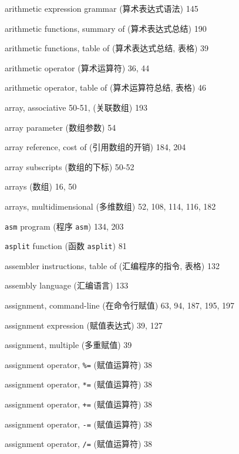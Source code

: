 \begin{multicols}{2}
\hangindent=2pc  arithmetic expression grammar (算术表达式语法) 145

\hangindent=2pc  arithmetic functions, summary of
(算术表达式总结) 190

\hangindent=2pc  arithmetic functions, table of
(算术表达式总结, 表格) 39

\hangindent=2pc  arithmetic operator (算术运算符) 36, 44

\hangindent=2pc  arithmetic operator, table of (算术运算符总结,
表格) 46

\hangindent=2pc  array, associative 50-51, (关联数组) 193

\hangindent=2pc  array parameter (数组参数) 54

\hangindent=2pc  array reference, cost of (引用数组的开销) 184, 204

\hangindent=2pc  array subscripts (数组的下标) 50-52

\hangindent=2pc  arrays (数组) 16, 50

\hangindent=2pc  arrays, multidimensional (多维数组) 52, 108, 114, 116, 182

\hangindent=2pc  \verb'asm' program (程序 \verb'asm') 134, 203

\hangindent=2pc  \verb'asplit' function (函数 \verb'asplit') 81

\hangindent=2pc  assembler instructions, table of
(汇编程序的指令, 表格) 132

\hangindent=2pc  assembly language (汇编语言) 133

\hangindent=2pc  assignment, command-line (在命令行赋值) 63, 94, 187, 195, 197

\hangindent=2pc  assignment expression (赋值表达式) 39, 127

\hangindent=2pc  assignment, multiple (多重赋值) 39

\hangindent=2pc  assignment operator, \verb'%=' (赋值运算符) 38

\hangindent=2pc  assignment operator, \verb'*=' (赋值运算符) 38

\hangindent=2pc  assignment operator, \verb'+=' (赋值运算符) 38

\hangindent=2pc  assignment operator, \verb'-=' (赋值运算符) 38

\hangindent=2pc  assignment operator, \verb'/=' (赋值运算符) 38


\end{multicols}
